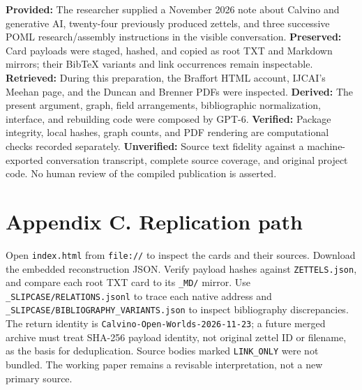 \documentclass[
  11pt,
  letterpaper,
]{article}
\begin{document}
\textbf{Provided:} The researcher supplied a November 2026 note about
Calvino and generative AI, twenty-four previously produced zettels, and
three successive POML research/assembly instructions in the visible
conversation. \textbf{Preserved:} Card payloads were staged, hashed, and
copied as root TXT and Markdown mirrors; their BibTeX variants and link
occurrences remain inspectable. \textbf{Retrieved:} During this
preparation, the Braffort HTML account, IJCAI's Meehan page, and the
Duncan and Brenner PDFs were inspected. \textbf{Derived:} The present
argument, graph, field arrangements, bibliographic normalization,
interface, and rebuilding code were composed by GPT-6.
\textbf{Verified:} Package integrity, local hashes, graph counts, and
PDF rendering are computational checks recorded separately.
\textbf{Unverified:} Source text fidelity against a machine-exported
conversation transcript, complete source coverage, and original project
code. No human review of the compiled publication is asserted.

\section{Appendix C. Replication
path}\label{appendix-c.-replication-path}

Open \texttt{index.html} from \texttt{file://} to inspect the cards and
their sources. Download the embedded reconstruction JSON. Verify payload
hashes against \texttt{ZETTELS.json}, and compare each root TXT card to
its \texttt{\_MD/} mirror. Use \texttt{\_SLIPCASE/RELATIONS.jsonl} to
trace each native address and
\texttt{\_SLIPCASE/BIBLIOGRAPHY\_VARIANTS.json} to inspect bibliography
discrepancies. The return identity is
\texttt{Calvino-Open-Worlds-2026-11-23}; a future merged archive must
treat SHA-256 payload identity, not original zettel ID or filename, as
the basis for deduplication. Source bodies marked \texttt{LINK\_ONLY}
were not bundled. The working paper remains a revisable interpretation,
not a new primary source.

\label{refs}
\end{document}
